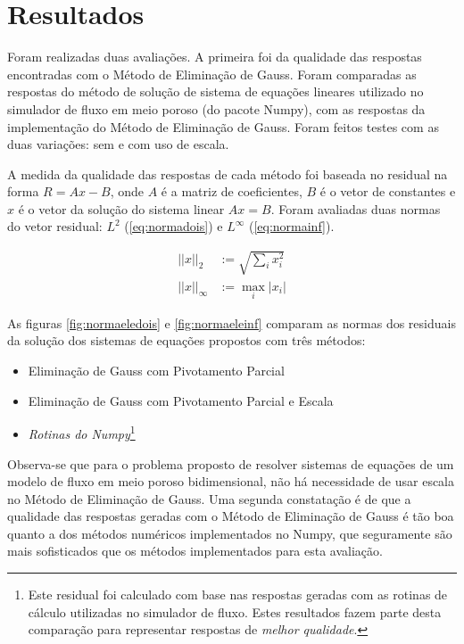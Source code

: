 \documentclass[final,5p]{elsarticle}
\numberwithin{equation}{section}
\begin{document}
\section{Resultados}

        Foram realizadas duas avaliações. A primeira foi da qualidade das respostas encontradas com o Método de Eliminação de Gauss. Foram comparadas as respostas do método de solução de sistema de equações lineares utilizado no simulador de fluxo em meio poroso (do pacote Numpy), com as respostas da implementação do Método de Eliminação de Gauss. Foram feitos testes com as duas variações: sem e com uso de escala.

        A medida da qualidade das respostas de cada método foi baseada no residual na forma $R = Ax-B$, onde $A$ é a matriz de coeficientes, $B$ é o vetor de constantes e $x$ é o vetor da solução do sistema linear $Ax=B$. Foram avaliadas duas normas do vetor residual: $L^2$ (\ref{eq:normadois}) e $L^\infty$ (\ref{eq:normainf}).

        \begin{align}
            ||x||_2 &:= \sqrt{\sum_{i}x_i^2} \label{eq:normadois} \\
            ||x||_\infty &:= \max_{i} |x_i| \label{eq:normainf}
        \end{align}

        As figuras \ref{fig:normaeledois} e \ref{fig:normaeleinf} comparam as normas dos residuais da solução dos sistemas de equações propostos com três métodos:
        \begin{itemize}
            \item Eliminação de Gauss com Pivotamento Parcial
            \item Eliminação de Gauss com Pivotamento Parcial e Escala
            \item \emph{Rotinas do Numpy}\footnote{Este residual foi calculado com base nas respostas geradas com as rotinas de cálculo utilizadas no simulador de fluxo. Estes resultados fazem parte desta comparação para representar respostas de \emph{melhor qualidade}.}
        \end{itemize}

        Observa-se que para o problema proposto de resolver sistemas de equações de um modelo de fluxo em meio poroso bidimensional, não há necessidade de usar escala no Método de Eliminação de Gauss. Uma segunda constatação é de que a qualidade das respostas geradas com o Método de Eliminação de Gauss é tão boa quanto a dos métodos numéricos implementados no Numpy, que seguramente são mais sofisticados que os métodos implementados para esta avaliação.
\end{document}
